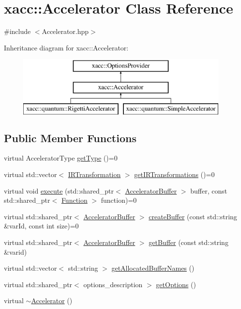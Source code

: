 \hypertarget{a01087}{}\section{xacc\+:\+:Accelerator Class Reference}
\label{a01087}


{\ttfamily \#include $<$Accelerator.\+hpp$>$}

Inheritance diagram for xacc\+:\+:Accelerator\+:\begin{figure}[H]
\begin{center}
\leavevmode
\includegraphics[height=3.000000cm]{a01087}
\end{center}
\end{figure}
\subsection*{Public Member Functions}
\begin{DoxyCompactItemize}
\item 
virtual Accelerator\+Type \hyperlink{a01087_aaffc3e4bb9880eb5041b1b58ee4c2665}{get\+Type} ()=0
\item 
virtual std\+::vector$<$ \hyperlink{a01155}{I\+R\+Transformation} $>$ \hyperlink{a01087_ad6e4a642dcb24e552675bcbeff1e1b04}{get\+I\+R\+Transformations} ()=0
\item 
virtual void \hyperlink{a01087_a89b3f3e6294f228abf03a410b0fb1674}{execute} (std\+::shared\+\_\+ptr$<$ \hyperlink{a01099}{Accelerator\+Buffer} $>$ buffer, const std\+::shared\+\_\+ptr$<$ \hyperlink{a01127}{Function} $>$ function)=0
\item 
virtual std\+::shared\+\_\+ptr$<$ \hyperlink{a01099}{Accelerator\+Buffer} $>$ \hyperlink{a01087_a064a2dbd58338364115c260267806945}{create\+Buffer} (const std\+::string \&var\+Id, const int size)=0
\item 
virtual std\+::shared\+\_\+ptr$<$ \hyperlink{a01099}{Accelerator\+Buffer} $>$ \hyperlink{a01087_ab3820be326e28a553fed1a824f4d41d0}{get\+Buffer} (const std\+::string \&varid)
\item 
virtual std\+::vector$<$ std\+::string $>$ \hyperlink{a01087_ae1463d7e405df89fa4af47e8922f4b82}{get\+Allocated\+Buffer\+Names} ()
\item 
virtual std\+::shared\+\_\+ptr$<$ options\+\_\+description $>$ \hyperlink{a01087_a98c9eda6b54367c75667ecfbbf167979}{get\+Options} ()
\item 
virtual \hyperlink{a01087_aed88ab0d71b765f0b0f512684ccd4b55}{$\sim$\+Accelerator} ()
\end{DoxyCompactItemize}
